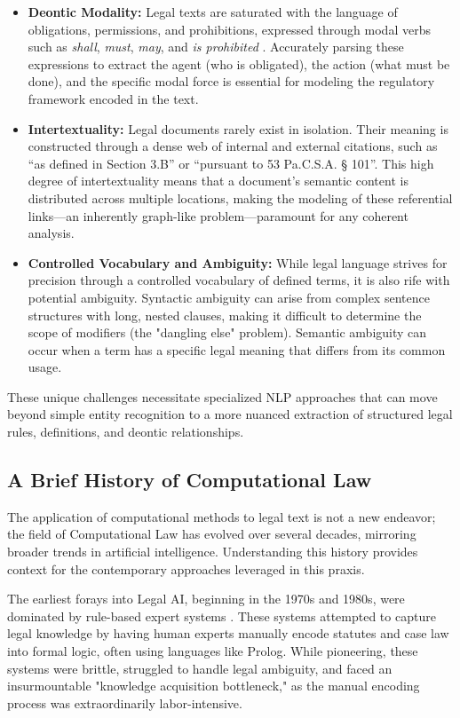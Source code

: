 \begin{itemize}
    \item \textbf{Deontic Modality:} Legal texts are saturated with the language of obligations, permissions, and prohibitions, expressed through modal verbs such as \textit{shall}, \textit{must}, \textit{may}, and \textit{is prohibited} \parencite{RefWorks:RefID:186-navarro2014deontic}. Accurately parsing these expressions to extract the agent (who is obligated), the action (what must be done), and the specific modal force is essential for modeling the regulatory framework encoded in the text.
    \item \textbf{Intertextuality:} Legal documents rarely exist in isolation. Their meaning is constructed through a dense web of internal and external citations, such as ``as defined in Section 3.B'' or ``pursuant to 53 Pa.C.S.A. § 101''. This high degree of intertextuality means that a document's semantic content is distributed across multiple locations, making the modeling of these referential links—an inherently graph-like problem—paramount for any coherent analysis.
    \item \textbf{Controlled Vocabulary and Ambiguity:} While legal language strives for precision through a controlled vocabulary of defined terms, it is also rife with potential ambiguity. Syntactic ambiguity can arise from complex sentence structures with long, nested clauses, making it difficult to determine the scope of modifiers (the "dangling else" problem). Semantic ambiguity can occur when a term has a specific legal meaning that differs from its common usage.
\end{itemize}
These unique challenges necessitate specialized NLP approaches that can move beyond simple entity recognition to a more nuanced extraction of structured legal rules, definitions, and deontic relationships.

\subsection{A Brief History of Computational Law}
\label{subsec:legal_ai_history}
The application of computational methods to legal text is not a new endeavor; the field of Computational Law has evolved over several decades, mirroring broader trends in artificial intelligence. Understanding this history provides context for the contemporary approaches leveraged in this praxis.

The earliest forays into Legal AI, beginning in the 1970s and 1980s, were dominated by rule-based expert systems \parencite{RefWorks:RefID:187-susskind1986expert}. These systems attempted to capture legal knowledge by having human experts manually encode statutes and case law into formal logic, often using languages like Prolog. While pioneering, these systems were brittle, struggled to handle legal ambiguity, and faced an insurmountable "knowledge acquisition bottleneck," as the manual encoding process was extraordinarily labor-intensive.

